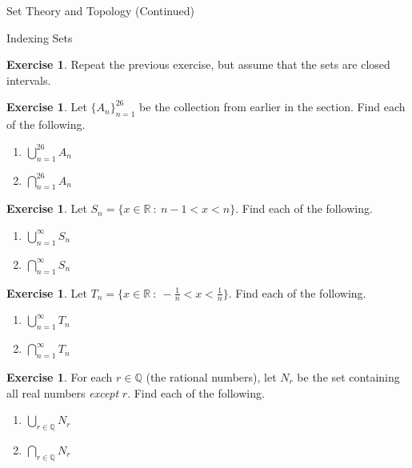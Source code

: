 \documentclass[11pt]{article}
\theoremstyle{definition}
\newtheorem{exercise}[theorem]{Exercise}
\begin{document}
\begin{section}{Set Theory and Topology (Continued)}
\begin{subsection}{Indexing Sets}
\begin{exercise}
Repeat the previous exercise, but assume that the sets are closed intervals.
\end{exercise}

\begin{exercise}
Let $\{A_n\}_{n=1}^{26}$ be the collection from earlier in the section.  Find each of the following.
\begin{enumerate}
\item $\displaystyle \bigcup_{n=1}^{26}A_n$
\item $\displaystyle \bigcap_{n=1}^{26}A_n$
\end{enumerate}
\end{exercise}

\begin{exercise}
Let $S_n = \{x \in \mathbb{R} \ : \ n-1<x<n \}$.  Find each of the following.
\begin{enumerate}
\item $\displaystyle \bigcup_{n=1}^{\infty}S_n$

\item $\displaystyle \bigcap_{n=1}^{\infty}S_n$
\end{enumerate}
\end{exercise}

\begin{exercise}
Let $T_n = \{x \in \mathbb{R} \ : \ -\frac{1}{n}<x< \frac{1}{n} \}$.  Find each of the following.
\begin{enumerate}
\item $\displaystyle \bigcup_{n=1}^{\infty}T_n$

\item $\displaystyle \bigcap_{n=1}^{\infty}T_n$
\end{enumerate}

\end{exercise}

\begin{exercise}
For each $r\in\mathbb{Q}$ (the rational numbers), let $N_r$ be the set containing all real numbers \emph{except} $r$.  Find each of the following.
\begin{enumerate}
\item $\displaystyle \bigcup_{r\in\mathbb{Q}}N_r$

\item $\displaystyle \bigcap_{r\in\mathbb{Q}}N_r$
\end{enumerate}

\end{exercise}


\end{subsection}
\end{section}
\end{document}

